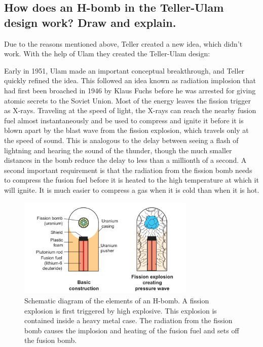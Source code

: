 \subsection{How does an H-bomb in the Teller-Ulam design work? Draw and explain.}

\begin{multisolutionblock}
    
Due to the reasons mentioned above, Teller created a new idea, which didn't work. With the help of Ulam they created the Teller-Ulam design:

Early in 1951, Ulam made an important conceptual breakthrough, and
Teller quickly refined the idea. This followed an idea known as radiation
implosion that had first been broached in 1946 by Klaus Fuchs before he was arrested for giving atomic secrets to the Soviet Union. Most of the energy leaves the fission trigger as X-rays. Traveling at the speed of light, the X-rays can reach the nearby fusion fuel almost instantaneously and be used to compress and ignite it before it is blown apart by the blast wave from the fission explosion, which travels only at the speed of sound. This is analogous to the delay between seeing a flash of lightning and hearing the sound of the thunder, though the much smaller distances in the bomb reduce the delay to less than a millionth of a second. A second important requirement is that the radiation from the fission bomb needs to compress the fusion fuel before it is heated to the high temperature at which it will ignite. It is much easier to compress a gas
when it is cold than when it is hot.

\begin{figure}[H]
    \centering
    \includegraphics[width=0.75\textwidth]{chapters/fig/6_teller.png}
    \caption{Schematic diagram of the elements of an H-bomb. A fission explosion is first triggered by high explosive. This explosion is contained inside a heavy metal case. The radiation from
    the fission bomb causes the implosion and heating of the fusion fuel and sets off the fusion bomb.}
    \label{fig:6_teller}
\end{figure}
    

\end{multisolutionblock}
